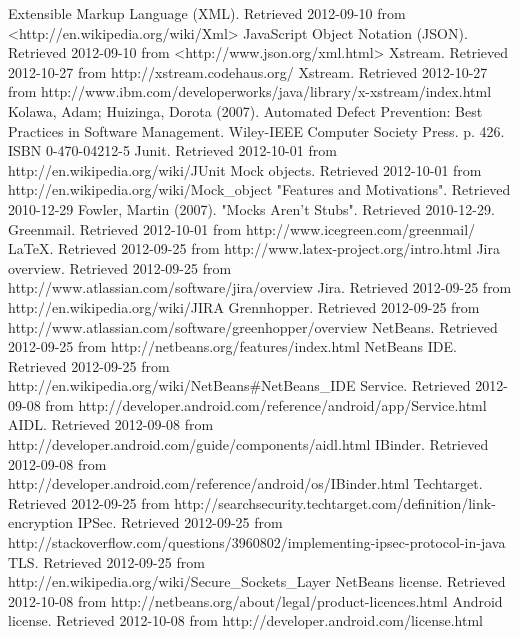 \documentclass[12pt]{report}
\begin{document}
\begin{thebibliography}{99}
 Extensible Markup Language (XML). Retrieved 2012-09-10 from <http://en.wikipedia.org/wiki/Xml>
 JavaScript Object Notation (JSON). Retrieved 2012-09-10 from <http://www.json.org/xml.html>
 Xstream. Retrieved 2012-10-27 from http://xstream.codehaus.org/
 Xstream. Retrieved 2012-10-27 from http://www.ibm.com/developerworks/java/library/x-xstream/index.html
 Kolawa, Adam; Huizinga, Dorota (2007). Automated Defect Prevention: Best Practices in Software Management. Wiley-IEEE Computer Society Press. p. 426. ISBN 0-470-04212-5
 Junit. Retrieved 2012-10-01 from http://en.wikipedia.org/wiki/JUnit
 Mock objects. Retrieved 2012-10-01 from http://en.wikipedia.org/wiki/Mock\_object
 "Features and Motivations". Retrieved 2010-12-29
 Fowler, Martin (2007). "Mocks Aren't Stubs". Retrieved 2010-12-29.
 Greenmail. Retrieved 2012-10-01 from http://www.icegreen.com/greenmail/
 LaTeX. Retrieved 2012-09-25 from http://www.latex-project.org/intro.html
 Jira overview. Retrieved 2012-09-25 from http://www.atlassian.com/software/jira/overview
 Jira. Retrieved 2012-09-25 from http://en.wikipedia.org/wiki/JIRA
 Grennhopper. Retrieved 2012-09-25 from http://www.atlassian.com/software/greenhopper/overview
 NetBeans. Retrieved 2012-09-25 from http://netbeans.org/features/index.html
 NetBeans IDE. Retrieved 2012-09-25 from http://en.wikipedia.org/wiki/NetBeans\#NetBeans\_IDE
 Service. Retrieved 2012-09-08 from http://developer.android.com/reference/android/app/Service.html
 AIDL. Retrieved 2012-09-08 from http://developer.android.com/guide/components/aidl.html
 IBinder. Retrieved 2012-09-08 from http://developer.android.com/reference/android/os/IBinder.html
 Techtarget. Retrieved 2012-09-25 from http://searchsecurity.techtarget.com/definition/link-encryption
 IPSec. Retrieved 2012-09-25 from http://stackoverflow.com/questions/3960802/implementing-ipsec-protocol-in-java
 TLS. Retrieved 2012-09-25 from http://en.wikipedia.org/wiki/Secure\_Sockets\_Layer
 NetBeans license. Retrieved 2012-10-08 from http://netbeans.org/about/legal/product-licences.html
 Android license. Retrieved 2012-10-08 from http://developer.android.com/license.html

\end{thebibliography}
\end{document}
